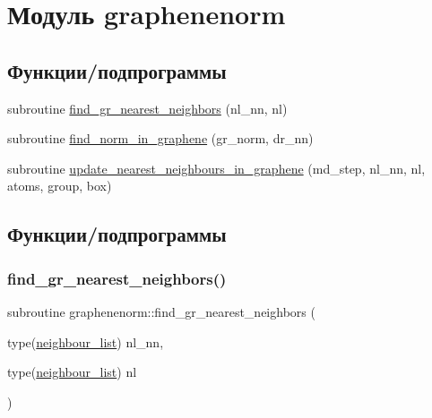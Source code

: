 \hypertarget{namespacegraphenenorm}{}\section{Модуль graphenenorm}
\label{namespacegraphenenorm}
\subsection*{Функции/подпрограммы}
\begin{DoxyCompactItemize}
\item 
subroutine \mbox{\hyperlink{namespacegraphenenorm_afb5708c33c6fe9d316e999710adeeef5}{find\+\_\+gr\+\_\+nearest\+\_\+neighbors}} (nl\+\_\+nn, nl)
\item 
subroutine \mbox{\hyperlink{namespacegraphenenorm_a6005cfed33b7112df95442616a990b5b}{find\+\_\+norm\+\_\+in\+\_\+graphene}} (gr\+\_\+norm, dr\+\_\+nn)
\item 
subroutine \mbox{\hyperlink{namespacegraphenenorm_a16d22fddd4c9f90cdf1236130515fd24}{update\+\_\+nearest\+\_\+neighbours\+\_\+in\+\_\+graphene}} (md\+\_\+step, nl\+\_\+nn, nl, atoms, group, box)
\end{DoxyCompactItemize}


\subsection{Функции/подпрограммы}
\mbox{\label{namespacegraphenenorm_afb5708c33c6fe9d316e999710adeeef5}} 
\subsubsection{\texorpdfstring{find\+\_\+gr\+\_\+nearest\+\_\+neighbors()}{find\_gr\_nearest\_neighbors()}}
{\footnotesize\ttfamily subroutine graphenenorm\+::find\+\_\+gr\+\_\+nearest\+\_\+neighbors (\begin{DoxyParamCaption}\item[{type(\mbox{\hyperlink{structmd__general_1_1neighbour__list}{neighbour\+\_\+list}})}]{nl\+\_\+nn,  }\item[{type(\mbox{\hyperlink{structmd__general_1_1neighbour__list}{neighbour\+\_\+list}})}]{nl }\end{DoxyParamCaption})}



